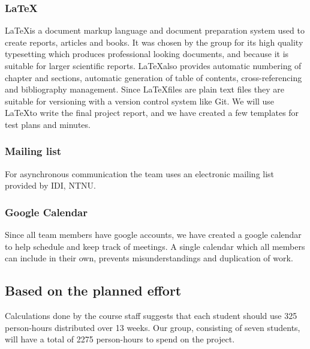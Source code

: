 \subsubsection{\LaTeX}
\LaTeX is a document markup language and document preparation system used to
create reports, articles and books. It was chosen by the group for its 
high quality typesetting which produces professional looking documents, and 
because it is suitable for larger scientific reports. \LaTeX also provides
automatic numbering of chapter and sections, automatic generation of table of
contents, cross-referencing and bibliography management. Since \LaTeX files
are plain text files they are suitable for versioning with a version control
system like Git. We will use \LaTeX to write the final project report, and we
have created a few templates for test plans and minutes.

\subsubsection{Mailing list}
For asynchronous communication the team uses an electronic mailing list
provided by IDI, NTNU.

\subsubsection{Google Calendar}
Since all team members have google accounts, we have created a google calendar
to help schedule and keep track of meetings. A single calendar which all
members can include in their own, prevents misunderstandings and duplication
of work.

\subsection{Based on the planned effort}
Calculations done by the course staff suggests that each student should use 325 person-hours distributed over 13 weeks. Our group, consisting of seven students, will have a total of 2275 person-hours to spend on the project. 

